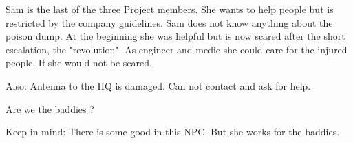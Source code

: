 \begin{npcBox}[title=Sam]
    \begin{consequences}
    \item {}
    \item {}
    \item {}
    \end{consequences}
    
    \begin{npcDescription}
    Sam is the last of the three Project members. She wants to help people but is restricted by the company guidelines. Sam does not know anything about the poison dump. At the beginning she was helpful but is now scared after the short escalation, the "revolution". As engineer and medic she could care for the injured people. If she would not be scared.

    Also: Antenna to the HQ is damaged. Can not contact and ask for help.
    
    Are we the baddies ?
    
    Keep in mind: There is some good in this NPC. But she works for the baddies.
    \end{npcDescription}
    
\end{npcBox}


